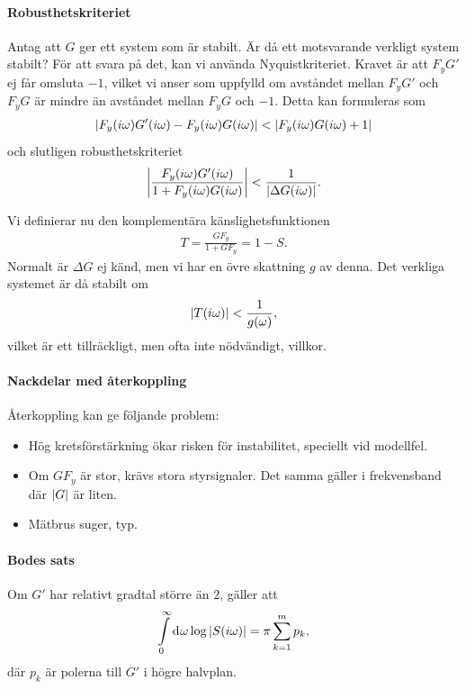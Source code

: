 \paragraph{Robusthetskriteriet}
Antag att $G$ ger ett system som är stabilt. Är då ett motsvarande verkligt system stabilt? För att svara på det, kan vi använda Nyquistkriteriet. Kravet är att $F_{y}G'$ ej får omsluta $-1$, vilket vi anser som uppfylld om avståndet mellan $F_{y}G'$ och $F_{y}G$ är mindre än avståndet mellan $F_{y}G$ och $-1$. Detta kan formuleras som
\begin{align*}
	\abs{F_{y}(i\omega)G'(i\omega) - F_{y}(i\omega)G(i\omega)} < \abs{F_{y}(i\omega)G(i\omega) + 1}
\end{align*}
och slutligen robusthetskriteriet
\begin{align*}
	\abs{\frac{F_{y}(i\omega)G'(i\omega)}{1 + F_{y}(i\omega)G(i\omega)}} < \frac{1}{\abs{\Delta G(i\omega)}}.
\end{align*}

Vi definierar nu den komplementära känslighetsfunktionen
\begin{align*}
	T = \frac{GF_{y}}{1 + GF_{y}} = 1 - S.
\end{align*}
Normalt är $\Delta G$ ej känd, men vi har en övre skattning $g$ av denna. Det verkliga systemet är då stabilt om
\begin{align*}
	\abs{T(i\omega)} < \frac{1}{g(\omega)},
\end{align*}
vilket är ett tillräckligt, men ofta inte nödvändigt, villkor.

\paragraph{Nackdelar med återkoppling}
Återkoppling kan ge följande problem:
\begin{itemize}
	\item Hög kretsförstärkning ökar risken för instabilitet, speciellt vid modellfel.
	\item Om $GF_{y}$ är stor, krävs stora styrsignaler. Det samma gäller i frekvensband där $\abs{G}$ är liten.
	\item Mätbrus suger, typ.
\end{itemize}

\paragraph{Bodes sats}
Om $G'$ har relativt gradtal större än $2$, gäller att
\begin{align*}
	\int\limits_{0}^{\infty}\dd[]{\omega}\log{\abs{S(i\omega)}} = \pi\sum\limits_{k = 1}^{m}p_{k},
\end{align*}
där $p_{k}$ är polerna till $G'$ i högre halvplan.